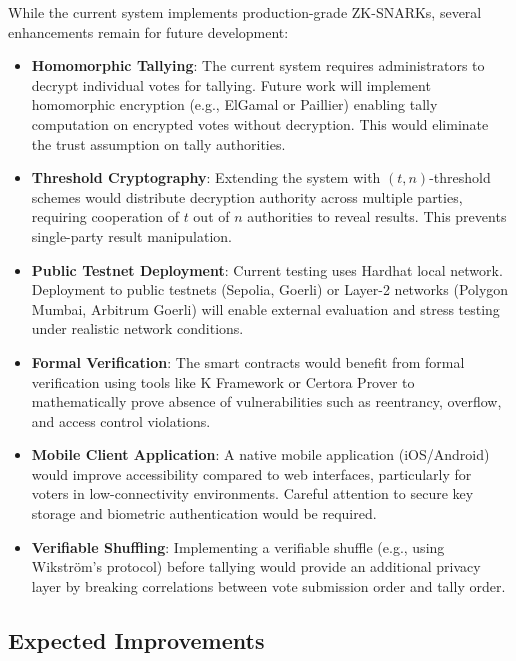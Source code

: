 \documentclass[conference]{IEEEtran}
\begin{document}
While the current system implements production-grade ZK-SNARKs, several enhancements remain for future development:

\begin{itemize}
    \item \textbf{Homomorphic Tallying}: The current system requires administrators to decrypt individual votes for tallying. Future work will implement homomorphic encryption (e.g., ElGamal or Paillier) enabling tally computation on encrypted votes without decryption. This would eliminate the trust assumption on tally authorities.
    
    \item \textbf{Threshold Cryptography}: Extending the system with $(t, n)$-threshold schemes would distribute decryption authority across multiple parties, requiring cooperation of $t$ out of $n$ authorities to reveal results. This prevents single-party result manipulation.
    
    \item \textbf{Public Testnet Deployment}: Current testing uses Hardhat local network. Deployment to public testnets (Sepolia, Goerli) or Layer-2 networks (Polygon Mumbai, Arbitrum Goerli) will enable external evaluation and stress testing under realistic network conditions.
    
    \item \textbf{Formal Verification}: The smart contracts would benefit from formal verification using tools like K Framework or Certora Prover to mathematically prove absence of vulnerabilities such as reentrancy, overflow, and access control violations.
    
    \item \textbf{Mobile Client Application}: A native mobile application (iOS/Android) would improve accessibility compared to web interfaces, particularly for voters in low-connectivity environments. Careful attention to secure key storage and biometric authentication would be required.
    
    \item \textbf{Verifiable Shuffling}: Implementing a verifiable shuffle (e.g., using Wikström's protocol) before tallying would provide an additional privacy layer by breaking correlations between vote submission order and tally order.
\end{itemize}

\subsection{Expected Improvements}
\end{document}
